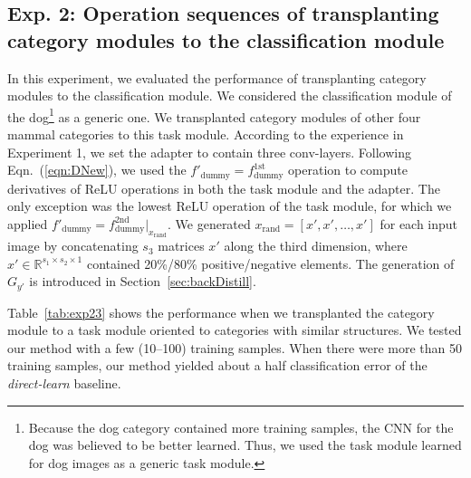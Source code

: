 \documentclass[10pt,twocolumn,letterpaper]{article}
\begin{document}
\subsection{Exp. 2: Operation sequences of transplanting category modules to the classification module}

In this experiment, we evaluated the performance of transplanting category modules to the classification module. We considered the classification module of the dog\footnote[5]{Because the dog category contained more training samples, the CNN for the dog was believed to be better learned. Thus, we used the task module learned for dog images as a generic task module.} as a generic one. We transplanted category modules of other four mammal categories to this task module. According to the experience in Experiment 1, we set the adapter to contain three conv-layers. Following Eqn.~(\ref{eqn:DNew}), we used the {\small$f'_{\textrm{dummy}}=f^{\textrm{1st}}_{\textrm{dummy}}$} operation to compute derivatives of ReLU operations in both the task module and the adapter\textcolor{red}{\footnotemark[3]}. The only exception was the lowest ReLU operation of the task module, for which we applied {\small$f'_{\textrm{dummy}}=f^{\textrm{2nd}}_{\textrm{dummy}}|_{x_{\textrm{rand}}}$}. We generated {\small$x_{\textrm{rand}}=[x',x',\ldots,x']$} for each input image by concatenating {\small$s_3$} matrices $x'$ along the third dimension, where {\small$x'\in\mathbb{R}^{s_1\times s_2\times 1}$} contained 20\%/80\% positive/negative elements. The generation of $G_{y'}$ is introduced in Section~\ref{sec:backDistill}.

Table~\ref{tab:exp23} shows the performance when we transplanted the category module to a task module oriented to categories with similar structures. We tested our method with a few (10--100) training samples. When there were more than 50 training samples, our method yielded about a half classification error of the \textit{direct-learn} baseline.
\end{document}
